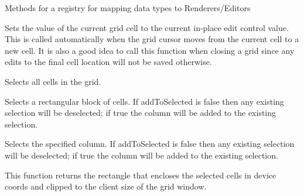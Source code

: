 Methods for a registry for mapping data types to Renderers/Editors



\label{wxgridsaveeditcontrolvalue}


Sets the value of the current grid cell to the current in-place edit control value.
This is called automatically when the grid cursor moves from the current cell to a
new cell. It is also a good idea to call this function when closing a grid since
any edits to the final cell location will not be saved otherwise.



\label{wxgridselectall}


Selects all cells in the grid.



\label{wxgridselectblock}



Selects a rectangular block of cells. If addToSelected is false then any existing selection will be
deselected; if true the column will be added to the existing selection.



\label{wxgridselectcol}


Selects the specified column. If addToSelected is false then any existing selection will be
deselected; if true the column will be added to the existing selection.



\label{wxgridselectiontodevicerect}


This function returns the rectangle that encloses the selected cells
in device coords and clipped to the client size of the grid window.



